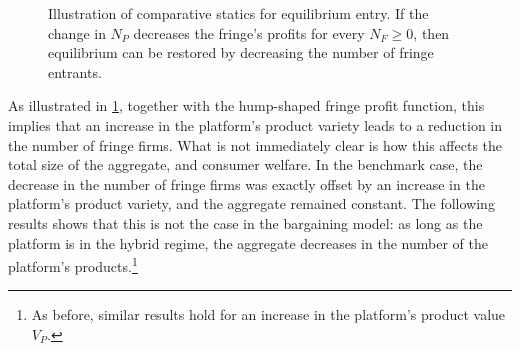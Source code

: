 \documentclass[a4paper]{article}
\begin{document}
\begin{figure}[ht]
    \centering
    \caption{Illustration of comparative statics for equilibrium entry. If the change in $N_P$ decreases the fringe's profits for every $N_F \geq 0$, then equilibrium can be restored by decreasing the number of fringe entrants.}
    \label{fig:comparative_N_F}
\end{figure}

As illustrated in \cref{fig:comparative_N_F}, together with the hump-shaped fringe profit function, this implies that an increase in the platform's product variety leads to a reduction in the number of fringe firms.
What is not immediately clear is how this affects the total size of the aggregate, and consumer welfare.
In the benchmark case, the decrease in the number of fringe firms was exactly offset by an increase in the platform's product variety, and the aggregate remained constant.
The following results shows that this is not the case in the bargaining model: as long as the platform is in the hybrid regime, the aggregate decreases in the number of the platform's products.\footnote{
    As before, similar results hold for an increase in the platform's product value $V_P$.
}
\end{document}
